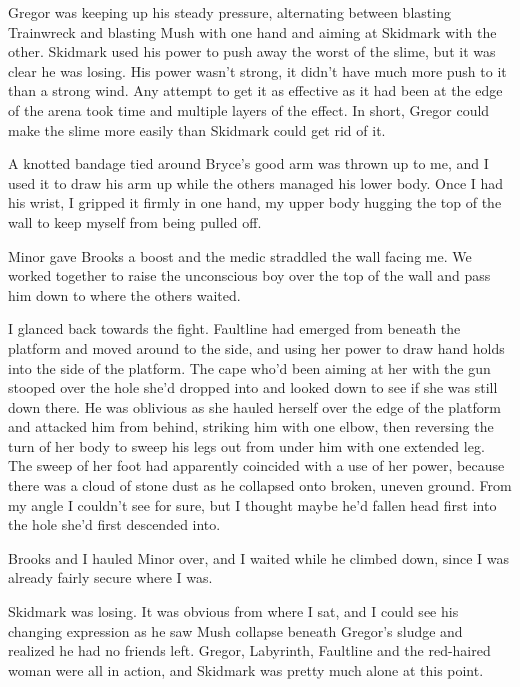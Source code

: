 Gregor was keeping up his steady pressure, alternating between blasting Trainwreck and blasting Mush with one hand and aiming at Skidmark with the other.  Skidmark used his power to push away the worst of the slime, but it was clear he was losing.  His power wasn't strong, it didn't have much more push to it than a strong wind.  Any attempt to get it as effective as it had been at the edge of the arena took time and multiple layers of the effect.  In short, Gregor could make the slime more easily than Skidmark could get rid of it.



A knotted bandage tied around Bryce's good arm was thrown up to me, and I used it to draw his arm up while the others managed his lower body.  Once I had his wrist, I gripped it firmly in one hand, my upper body hugging the top of the wall to keep myself from being pulled off.



Minor gave Brooks a boost and the medic straddled the wall facing me.  We worked together to raise the unconscious boy over the top of the wall and pass him down to where the others waited.



I glanced back towards the fight.  Faultline had emerged from beneath the platform and moved around to the side, and using her power to draw hand holds into the side of the platform.  The cape who'd been aiming at her with the gun stooped over the hole she'd dropped into and looked down to see if she was still down there.  He was oblivious as she hauled herself over the edge of the platform and attacked him from behind, striking him with one elbow, then reversing the turn of her body to sweep his legs out from under him with one extended leg.  The sweep of her foot had apparently coincided with a use of her power, because there was a cloud of stone dust as he collapsed onto broken, uneven ground.  From my angle I couldn't see for sure, but I thought maybe he'd fallen head first into the hole she'd first descended into.



Brooks and I hauled Minor over, and I waited while he climbed down, since I was already fairly secure where I was.



Skidmark was losing.  It was obvious from where I sat, and I could see his changing expression as he saw Mush collapse beneath Gregor's sludge and realized he had no friends left.  Gregor, Labyrinth, Faultline and the red-haired woman were all in action, and Skidmark was pretty much alone at this point.



